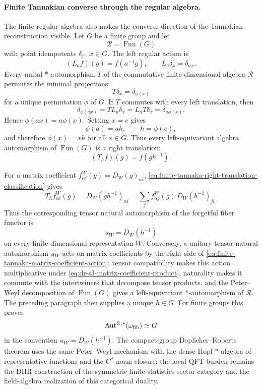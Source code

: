 \paragraph{Finite Tannakian converse through the regular algebra.}
The finite regular algebra also makes the converse direction of the
Tannakian reconstruction visible.  Let \(G\) be a finite group and let
\[
  \mathcal R=\operatorname{Fun}(G)
\]
with point idempotents \(\delta_x\), \(x\in G\).  The left regular action is
\begin{equation}
  (L_a f)(g)=f(a^{-1}g),
  \qquad
  L_a\delta_x=\delta_{ax}.
  \label{eq:finite-tannaka-left-regular-action}
\end{equation}
Every unital \(*\)-automorphism \(T\) of the commutative finite-dimensional
algebra \(\mathcal R\) permutes the minimal projections:
\[
  T\delta_x=\delta_{\phi(x)}
\]
for a unique permutation \(\phi\) of \(G\).  If \(T\) commutes with every
left translation, then
\[
  \delta_{\phi(ax)}
  =
  T L_a\delta_x
  =
  L_a T\delta_x
  =
  \delta_{a\phi(x)} .
\]
Hence \(\phi(ax)=a\phi(x)\).  Setting \(x=e\) gives
\[
  \phi(a)=a h,\qquad h=\phi(e),
\]
and therefore \(\phi(x)=xh\) for all \(x\in G\).  Thus every
left-equivariant algebra automorphism of \(\operatorname{Fun}(G)\) is a right
translation:
\begin{equation}
  (T_h f)(g)=f(g h^{-1}).
  \label{eq:finite-tannaka-right-translation-classification}
\end{equation}

For a matrix coefficient \(f^W_{\alpha i}(g)=D_W(g)_{\alpha i}\),
\eqref{eq:finite-tannaka-right-translation-classification} gives
\begin{equation}
  T_h f^W_{\alpha i}(g)
  =
  D_W(g h^{-1})_{\alpha i}
  =
  \sum_j f^W_{\alpha j}(g)\,D_W(h^{-1})_{ji}.
  \label{eq:finite-tannaka-matrix-coefficient-action}
\end{equation}
Thus the corresponding tensor natural automorphism of the forgetful fiber
functor is
\[
  u_W=D_W(h^{-1})
\]
on every finite-dimensional representation \(W\).  Conversely, a unitary
tensor natural automorphism \(u_W\) acts on matrix coefficients by the right
side of \eqref{eq:finite-tannaka-matrix-coefficient-action}; tensor
compatibility makes this action multiplicative under
\eqref{eq:dr-s3-matrix-coefficient-product}, naturality makes it commute
with the intertwiners that decompose tensor products, and the Peter--Weyl
decomposition of \(\operatorname{Fun}(G)\) gives a left-equivariant
\(*\)-automorphism of \(\mathcal R\).  The preceding paragraph then supplies a
unique \(h\in G\).  For finite groups this proves
\[
  \operatorname{Aut}^{\otimes,*}(\omega_{\rm fib})
  \simeq
  G
\]
in the convention \(u_W=D_W(h^{-1})\).  The compact-group
Doplicher--Roberts theorem uses the same Peter--Weyl mechanism with the
dense Hopf \(*\)-algebra of representative functions and the \(C^*\)-norm
closure; the local-QFT burden remains the DHR construction of the symmetric
finite-statistics sector category and the field-algebra realization of this
categorical duality.

